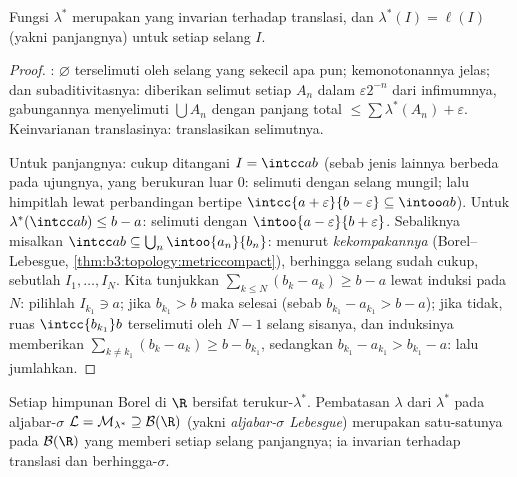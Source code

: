 \begin{lemma}\label{lem:b3:measure:outerbasics}
Fungsi $\lambda^*$ merupakan  yang invarian terhadap translasi,
dan $\lambda^*(I) = \ell(I)$ (yakni panjangnya) untuk setiap selang
$I$.
\end{lemma}

\begin{proof}
: $\varnothing$ terselimuti oleh selang yang sekecil
apa pun; kemonotonannya jelas; dan subaditivitasnya: diberikan selimut
setiap $A_n$ dalam $\varepsilon 2^{-n}$ dari infimumnya,
gabungannya menyelimuti $\bigcup A_n$ dengan panjang total $\leq \sum
\lambda^*(A_n) + \varepsilon$. Keinvarianan translasinya:
translasikan selimutnya.

Untuk panjangnya: cukup ditangani $I = \intcc ab$ (sebab jenis lainnya
berbeda pada ujungnya, yang berukuran luar $0$: selimuti dengan
selang mungil; lalu himpitlah lewat perbandingan bertipe $\intcc{a+\varepsilon}{b -
\varepsilon} \subseteq \intoo ab$).
Untuk $\lambda^*(\intcc ab) \leq b - a$: selimuti dengan
$\intoo{a-\varepsilon}{b+\varepsilon}$. Sebaliknya misalkan $\intcc
ab \subseteq \bigcup_n\intoo{a_n}{b_n}$: menurut
\emph{kekompakannya} (Borel--Lebesgue,
\cref{thm:b3:topology:metriccompact}), berhingga selang
sudah cukup, sebutlah $I_1, \dots, I_N$. Kita tunjukkan $\sum_{k\leq N}(b_k -
a_k) \geq b - a$ lewat induksi pada $N$: pilihlah $I_{k_1} \ni a$; jika
$b_{k_1} > b$ maka selesai (sebab $b_{k_1} - a_{k_1} > b - a$); jika tidak,
ruas $\intcc{b_{k_1}}b$ terselimuti oleh $N - 1$ selang
sisanya, dan induksinya memberikan $\sum_{k \neq k_1}(b_k - a_k)
\geq b - b_{k_1}$, sedangkan $b_{k_1} - a_{k_1} > b_{k_1} - a$:
lalu jumlahkan.
\end{proof}

\begin{theorem}\label{thm:b3:measure:lebesgue}
Setiap himpunan Borel di $\R$ bersifat terukur-$\lambda^*$.
Pembatasan $\lambda$ dari $\lambda^*$ pada aljabar-$\sigma$
$\mathcal L = \mathcal M_{\lambda^*} \supseteq \mathcal B(\R)$
(yakni \emph{aljabar-$\sigma$ Lebesgue}) merupakan satu-satunya  pada
$\mathcal B(\R)$ yang memberi setiap selang panjangnya; ia
invarian terhadap translasi dan berhingga-$\sigma$.
\end{theorem}

